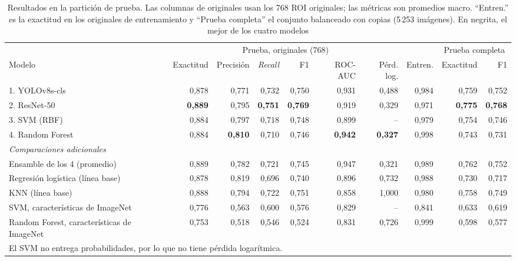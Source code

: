\begin{table}[t]
\centering\footnotesize
\setlength{\tabcolsep}{4.5pt}
\caption{Resultados en la partición de prueba. Las columnas de originales usan los 768 ROI originales; las métricas son promedios macro. ``Entren.'' es la exactitud en los originales de entrenamiento y ``Prueba completa'' el conjunto balanceado con copias (5\,253 imágenes). En negrita, el mejor de los cuatro modelos}
\label{tab:resultados}
\begin{tabular}{lrrrrrrrrr}
\toprule
 & \multicolumn{6}{c}{Prueba, originales (768)} & & \multicolumn{2}{c}{Prueba completa} \\
\cmidrule(lr){2-7}\cmidrule(lr){9-10}
Modelo & Exactitud & Precisión & \emph{Recall} & F1 & ROC-AUC & Pérd. log. & Entren. & Exactitud & F1 \\
\midrule
1. YOLOv8s-cls        & 0,878 & 0,771 & 0,732 & 0,750 & 0,931 & 0,488 & 0,984 & 0,759 & 0,752 \\
2. ResNet-50          & \textbf{0,889} & 0,795 & \textbf{0,751} & \textbf{0,769} & 0,919 & 0,329 & 0,971 & \textbf{0,775} & \textbf{0,768} \\
3. SVM (RBF)          & 0,884 & 0,797 & 0,718 & 0,748 & 0,899 & -- & 0,979 & 0,754 & 0,746 \\
4. Random Forest      & 0,884 & \textbf{0,810} & 0,710 & 0,746 & \textbf{0,942} & \textbf{0,327} & 0,998 & 0,743 & 0,731 \\
\midrule
\multicolumn{10}{l}{\emph{Comparaciones adicionales}} \\
Ensamble de los 4 (promedio)            & 0,889 & 0,782 & 0,721 & 0,745 & 0,947 & 0,321 & 0,989 & 0,762 & 0,752 \\
Regresión logística (línea base)        & 0,878 & 0,819 & 0,696 & 0,740 & 0,896 & 0,732 & 0,988 & 0,730 & 0,717 \\
KNN (línea base)                        & 0,888 & 0,794 & 0,722 & 0,751 & 0,858 & 1,000 & 0,980 & 0,758 & 0,749 \\
SVM, características de ImageNet        & 0,776 & 0,563 & 0,600 & 0,576 & 0,829 & -- & 0,841 & 0,633 & 0,619 \\
Random Forest, características de ImageNet & 0,753 & 0,518 & 0,546 & 0,524 & 0,831 & 0,726 & 0,999 & 0,598 & 0,577 \\
\bottomrule
\multicolumn{10}{l}{\scriptsize El SVM no entrega probabilidades, por lo que no tiene pérdida logarítmica.}
\end{tabular}
\end{table}

